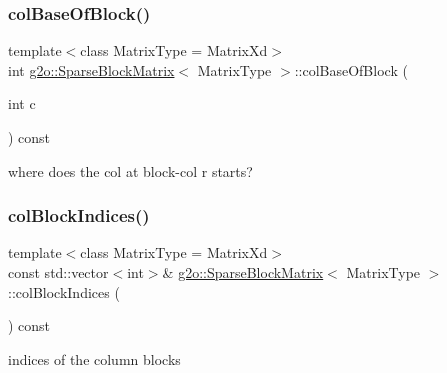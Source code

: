 \subsubsection{\texorpdfstring{col\+Base\+Of\+Block()}{colBaseOfBlock()}}
{\footnotesize\ttfamily template$<$class Matrix\+Type = Matrix\+Xd$>$ \\
int \mbox{\hyperlink{classg2o_1_1_sparse_block_matrix}{g2o\+::\+Sparse\+Block\+Matrix}}$<$ Matrix\+Type $>$\+::col\+Base\+Of\+Block (\begin{DoxyParamCaption}\item[{int}]{c }\end{DoxyParamCaption}) const\hspace{0.3cm}{\ttfamily [inline]}}



where does the col at block-\/col r starts? 

\mbox{\label{classg2o_1_1_sparse_block_matrix_a1dc1115273da4863f4625b1dc9569d89}} 
\subsubsection{\texorpdfstring{col\+Block\+Indices()}{colBlockIndices()}\hspace{0.1cm}{\footnotesize\ttfamily [1/2]}}
{\footnotesize\ttfamily template$<$class Matrix\+Type = Matrix\+Xd$>$ \\
const std\+::vector$<$int$>$\& \mbox{\hyperlink{classg2o_1_1_sparse_block_matrix}{g2o\+::\+Sparse\+Block\+Matrix}}$<$ Matrix\+Type $>$\+::col\+Block\+Indices (\begin{DoxyParamCaption}{ }\end{DoxyParamCaption}) const\hspace{0.3cm}{\ttfamily [inline]}}



indices of the column blocks 

\mbox{\label{classg2o_1_1_sparse_block_matrix_aba255bdbb8e0a0d2802ae27e6d4f7cc7}} 
